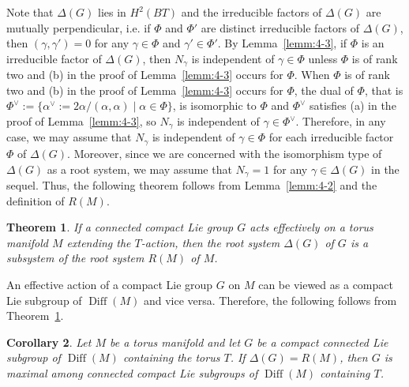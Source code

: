 \documentclass[12pt]{amsart}
\theoremstyle{plain} \numberwithin{equation}{section}
\newtheorem{theo}{Theorem}[section]
\newtheorem{coro}[theo]{Corollary}
\theoremstyle{definition}
\def\RG{\Delta(G)}
\DeclareMathOperator{\Diff}{Diff}
\begin{document}
Note that $\RG$ lies in $H^2(BT)$ and the irreducible factors of $\RG$ are mutually perpendicular, i.e. if $\Phi$ and $\Phi'$ are distinct irreducible factors of $\RG$, then $(\gamma, \gamma')=0$ for any $\gamma\in\Phi$ and $\gamma'\in\Phi'$.  By Lemma~\ref{lemm:4-3}, if $\Phi$ is an irreducible factor of $\RG$, then $N_\gamma$ is independent of $\gamma\in\Phi$ unless $\Phi$ is of rank two and (b) in the proof of Lemma~\ref{lemm:4-3} occurs for $\Phi$.  When $\Phi$ is of rank two and (b) in the proof of Lemma~\ref{lemm:4-3} occurs for $\Phi$, the dual of $\Phi$, that is 
$\Phi^\vee:=\{ \alpha^\vee:=2\alpha/(\alpha,\alpha)\mid \alpha\in \Phi\}$, is isomorphic to $\Phi$ and $\Phi^\vee$ satisfies (a) in the proof of Lemma~\ref{lemm:4-3}, so $N_\gamma$ is independent of $\gamma\in \Phi^\vee$.  Therefore, in any case, we may assume that $N_\gamma$ is independent of $\gamma\in \Phi$ for each irreducible factor $\Phi$ of $\RG$.  Moreover, since we are concerned with the isomorphism type of $\RG$ as a root system, we may assume that $N_\gamma=1$ for any $\gamma\in \RG$ in the sequel.  Thus, the following theorem follows from Lemma~\ref{lemm:4-2} and the definition of $R(M)$.  

\begin{theo} \label{theo:4-1}
If a connected compact Lie group $G$ acts effectively on a torus manifold $M$ extending the $T$-action, then the root system $\RG$ of $G$ is a subsystem of the root system $R(M)$ of $M$. 
\end{theo} 

An effective action of a compact Lie group $G$ on $M$ can be viewed as a compact Lie subgroup of $\Diff(M)$ and vice versa.  Therefore, the following follows from Theorem~\ref{theo:4-1}. 

\begin{coro} \label{coro:4-1}
Let $M$ be a torus manifold and let $G$ be a compact connected Lie subgroup of $\Diff(M)$ containing the torus $T$.  If $\RG=R(M)$, then $G$ is maximal among connected compact Lie subgroups of $\Diff(M)$ containing $T$.  
\end{coro}
\end{document}
